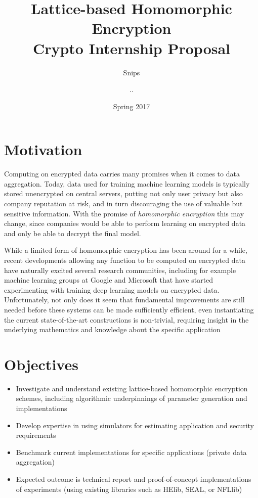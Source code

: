 \documentclass{article}
\title{Lattice-based Homomorphic Encryption \\ {\large Crypto Internship Proposal}}
\author{{\small Snips} \and {\small ..}}
\date{Spring 2017}
\begin{document}
\maketitle

\section*{Motivation}
Computing on encrypted data carries many promises when it comes to data aggregation. Today, data used for training machine learning models is typically stored unencrypted on central servers, putting not only user privacy but also company reputation at risk, and in turn discouraging the use of valuable but sensitive information. With the promise of \emph{homomorphic encryption} this may change, since companies would be able to perform learning on encrypted data and only be able to decrypt the final model.

While a limited form of homomorphic encryption has been around for a while, recent developments allowing any function to be computed on encrypted data have naturally excited several research communities, including for example machine learning groups at Google and Microsoft that have started experimenting with training deep learning models on encrypted data. Unfortunately, not only does it seem that fundamental improvements are still needed before these systems can be made sufficiently efficient, even instantiating the current state-of-the-art constructions is non-trivial, requiring insight in the underlying mathematics and knowledge about the specific application

\section*{Objectives}
\begin{itemize}
\item Investigate and understand existing lattice-based homomorphic encryption schemes, including algorithmic underpinnings of parameter generation and implementations
\item Develop expertise in using simulators for estimating application and security requirements
\item Benchmark current implementations for specific applications (private data aggregation)
\item Expected outcome is technical report and proof-of-concept implementations of experiments (using existing libraries such as HElib, SEAL, or NFLlib)
\end{itemize}
\end{document}
